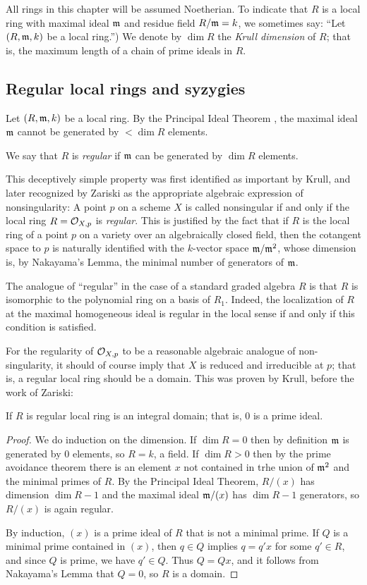 All rings in this chapter will be assumed Noetherian. To indicate that $R$ is a local ring with maximal ideal $\mathfrak m$ and residue field $R/\mathfrak m = k$, we sometimes  say: ``Let $(R,\mathfrak m,k)$ be a local ring.'') We denote by $\dim R$ the \emph{Krull dimension} of $R$; that is, the maximum length of a chain of prime ideals in $R$.

\subsection{Regular local rings and syzygies}
Let $(R,\mathfrak m,k)$ be a local ring. By the Principal Ideal Theorem \cite[]{E}, the maximal ideal $\mathfrak m$ cannot be generated by  $<\dim R$ elements.

\begin{definition}
 We say that $R$ is \emph{regular} if $\mathfrak m$ can be generated by $\dim R$ elements.
\end{definition}

This deceptively simple property was first identified as important by Krull, and later recognized by Zariski as the appropriate algebraic expression of nonsingularity: A point $p$ on a scheme $X$ is called nonsingular if and only if the local ring $R = {\mathcal O}_{X,p}$ is \emph{regular}. This is justified by the fact that if $R$ is the local ring of a point $p$ on a variety over an algebraically closed field, then the cotangent space to $p$ is naturally identified with the 
$k$-vector space $\mathfrak m/\mathfrak m^{2}$, whose dimension is, by Nakayama's Lemma, the minimal number of generators of $\mathfrak m$. 

The analogue of ``regular'' in the case of a standard graded algebra $R$ is that $R$ is isomorphic to the 
polynomial ring on a basis of $R_{1}$. Indeed, the localization of $R$ at the maximal homogeneous ideal is regular in the local sense if and only if this condition is satisfied.

For the regularity of ${\mathcal O}_{X,p}$ to be a reasonable algebraic analogue of non-singularity, it should of course imply
that $X$ is reduced and irreducible at $p$; that is, a regular local ring should be a domain. This was proven by Krull, before the work of Zariski:

\begin{proposition}
 If $R$ is regular local ring is an integral domain; that is, 0 is a prime ideal.
\end{proposition}
\begin{proof}
 We do induction on the dimension. If $\dim R = 0$ then by definition $\mathfrak m$ is generated by 0 elements, so $R = k$,
 a field. If $\dim R>0$ then by the prime avoidance theorem \cite[]{E} there is an element $x$ not contained in trhe union of $\mathfrak m^{2}$ and the minimal primes of $R$. By the Principal Ideal Theorem, $R/(x)$ has dimension $\dim R -1$ and the maximal ideal $\mathfrak m/(x)$ has $\dim R-1$ generators, so $R/(x)$ is again regular.
 
 By induction, $(x)$ is a prime ideal of $R$ that is not a minimal prime. If $Q$ is a minimal prime contained in $(x)$,
 then $q\in Q$ implies $q = q'x$ for some $q'\in R$, and since $Q$ is prime, we have $q'\in Q$. Thus
 $Q = Qx$, and it follows from Nakayama's Lemma that $Q=0$, so $R$ is a domain.
\end{proof}

